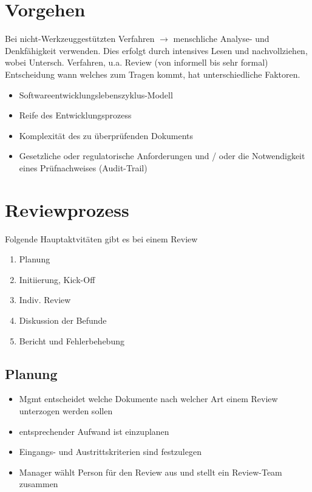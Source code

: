 \documentclass{report}
\theoremstyle{definition}
\theoremstyle{example}
\begin{document}
\section{Vorgehen}
Bei nicht-Werkzeuggestützten Verfahren $\rightarrow$ menschliche Analyse- und Denkfähigkeit verwenden. Dies erfolgt durch intensives Lesen und nachvollziehen, wobei Untersch. Verfahren, u.a. Review (von informell bis sehr formal) 
Entscheidung wann welches zum Tragen kommt, hat unterschiedliche Faktoren. 
\begin{itemize}
   \item Softwareentwicklungslebenszyklus-Modell
   \item Reife des Entwicklungsprozess
   \item Komplexität des zu überprüfenden Dokuments
   \item Gesetzliche oder regulatorische Anforderungen und / oder die Notwendigkeit eines Prüfnachweises (Audit-Trail)
\end{itemize}

\section{Reviewprozess}
Folgende Hauptaktvitäten gibt es bei einem Review
\begin{enumerate}
   \item Planung
   \item Initiierung, Kick-Off
   \item Indiv. Review
   \item Diskussion der Befunde
   \item Bericht und Fehlerbehebung
\end{enumerate}

\subsection{Planung}
\begin{itemize}
   \item Mgmt entscheidet welche Dokumente nach welcher Art einem Review unterzogen werden sollen
   \item entsprechender Aufwand ist einzuplanen
   \item Eingangs- und Austrittskriterien sind festzulegen
   \item Manager wählt Person für den Review aus und stellt ein Review-Team zusammen
\end{itemize}
\end{document}
